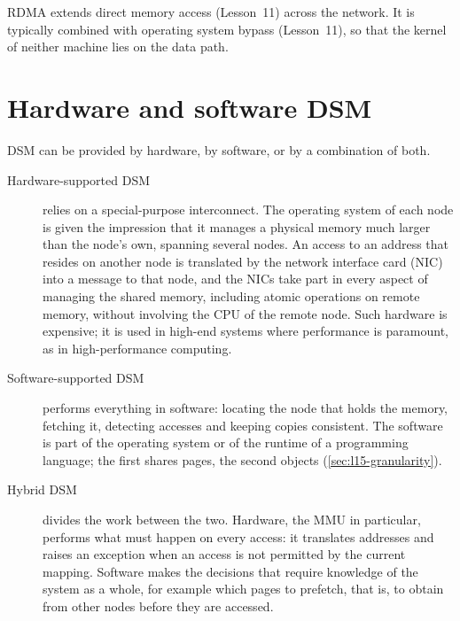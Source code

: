 \documentclass[../main.tex]{subfiles}
\begin{document}
RDMA extends direct memory access (Lesson~11)
across the network.  It is typically combined with operating system
bypass (Lesson~11), so that the kernel of
neither machine lies on the data path.

\section{Hardware and software DSM}
\label{sec:l15-hwsw}

DSM can be provided by hardware, by software, or by a combination of
both.
\begin{description}
  \item[Hardware-supported DSM] relies on a special-purpose interconnect.
    The operating system of each node is given the impression that it
    manages a physical memory much larger than the node's own, spanning
    several nodes.  An access to an address that resides on another node is
    translated by the network interface card (NIC) into a message to that
    node, and the NICs take part in every aspect of managing the shared
    memory, including atomic operations on remote memory, without involving
    the CPU of the remote node.  Such hardware is expensive; it is used in
    high-end systems where performance is paramount, as in high-performance
    computing.
  \item[Software-supported DSM] performs everything in software: locating
    the node that holds the memory, fetching it, detecting accesses and
    keeping copies consistent.  The software is part of the operating
    system or of the runtime of a programming language; the first shares
    pages, the second objects (\cref{sec:l15-granularity}).
  \item[Hybrid DSM] divides the work between the two.  Hardware, the MMU in
    particular, performs what must happen on every access: it translates
    addresses and raises an exception when an access is not permitted by
    the current mapping.  Software makes the decisions that require
    knowledge of the system as a whole, for example which pages to
    prefetch, that is, to obtain from other nodes before
    they are accessed.
\end{description}
\end{document}
